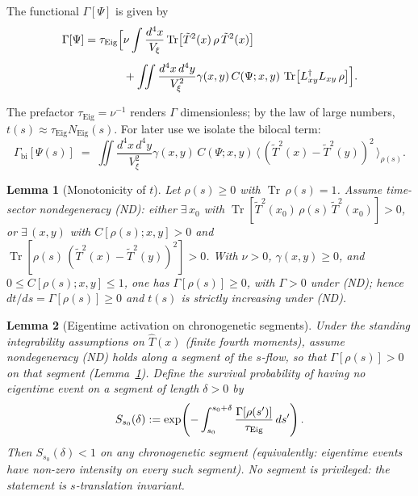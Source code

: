 \documentclass[12pt,a4paper]{article}
\newtheorem{lemma}{Lemma}[section]
\renewcommand{\Tr}{\operatorname{Tr}}
\newcommand{\Vxi}{V_\xi}          %
\newcommand{\intx}{\int \frac{d^4x}{\Vxi}}
\newcommand{\intxy}{\iint \frac{d^4x\,d^4y}{\Vxi^2}}
\numberwithin{equation}{section}
\begin{document}
\noindent The functional $\Gamma[\Psi]$ is given by
\begin{equation}
\begin{split}
\Gamma[\Psi] = \tau_{\mathrm{Eig}} \Bigl[
&\nu \intx \Tr\bigl[\tilde{T}^2(x)\,\rho\,\tilde{T}^2(x)\bigr] \\[4pt]
&+ \intxy \gamma(x,y)\,C(\Psi;x,y)\,\Tr\bigl[L_{xy}^\dagger L_{xy}\,\rho\bigr]
\Bigr].
\end{split}
\label{eq:gamma-decomposition}
\end{equation}

The prefactor $\tau_{\mathrm{Eig}}=\nu^{-1}$ renders $\Gamma$ dimensionless; by the law of large numbers, $t(s)\approx \tau_{\mathrm{Eig}}N_{\mathrm{Eig}}(s)$. For later use we isolate the bilocal term:
\begin{equation}
\Gamma_{\mathrm{bi}}[\Psi(s)] \;=\; 
\intxy \gamma(x,y)\,C(\Psi;x,y)\,
\big\langle\,(\tilde{T}^2(x)-\tilde{T}^2(y))^2\,\big\rangle_{\rho(s)}.
\label{eq:Gamma-bilocal}
\end{equation}

\begin{lemma}[Monotonicity of $t$]
\label{lem:Gamma-positive}
Let $\rho(s)\!\ge\!0$ with $\Tr\,\rho(s)=1$. Assume time-sector
nondegeneracy (ND): either $\exists\,x_0$ with
$\Tr[\tilde{T}^2(x_0)\,\rho(s)\,\tilde{T}^2(x_0)]>0$, or $\exists\,(x,y)$ with
$C[\rho(s);x,y]>0$ and
$\Tr[\rho(s)\,( \tilde{T}^2(x)-\tilde{T}^2(y) )^2]>0$. With $\nu>0$,
$\gamma(x,y)\ge 0$, and $0\le C[\rho(s);x,y]\le 1$, one has
$\Gamma[\rho(s)]\ge 0$, with $\Gamma>0$ under (ND); hence $dt/ds=\Gamma[\rho(s)]\ge 0$ and $t(s)$ is strictly
increasing under (ND).
\end{lemma}

\begin{lemma}[Eigentime activation on chronogenetic segments]
\label{lem:eigentime-activation}
Under the standing integrability assumptions on $\hat T(x)$ (finite fourth
moments), assume nondegeneracy (ND) holds along a segment of the $s$-flow, so that
$\Gamma[\rho(s)]>0$ on that segment (Lemma~\ref{lem:Gamma-positive}).
Define the survival probability of having no eigentime event on a segment of length
$\delta>0$ by
\[
S_{s_0}(\delta):=\exp\!\left(-\int_{s_0}^{s_0+\delta}\frac{\Gamma[\rho(s')]}{\tau_{\rm Eig}}\,ds'\right).
\]
Then $S_{s_0}(\delta)<1$ on any chronogenetic segment (equivalently: eigentime events have
non-zero intensity on every such segment). No segment is privileged: the statement is
$s$-translation invariant.
\end{lemma}
\end{document}
